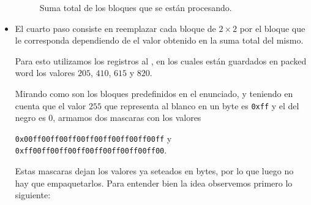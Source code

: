 \begin{itemize}
\begin{figure}[H]

    \caption{Suma total de los bloques que se están procesando.}
    \label{PHADDW}
  \end{figure}

  \item El cuarto paso consiste en reemplazar cada bloque de $2 \times 2$ por el bloque que le corresponda dependiendo de el valor obtenido en la suma total del mismo.

  Para esto utilizamos los registros  al , en los cuales están guardados en packed word los valores $205$, $410$, $615$ y $820$.

  Mirando como son los bloques predefinidos en el enunciado, y teniendo en cuenta que el valor $255$ que representa al blanco en un byte es \texttt{0xff} y el del negro es 0, armamos dos mascaras con los valores

  \texttt{0x00ff00ff00ff00ff00ff00ff00ff00ff} y \texttt{0xff00ff00ff00ff00ff00ff00ff00ff00}.

  Estas mascaras dejan los valores ya seteados en bytes, por lo que luego no hay que empaquetarlos.
  Para entender bien la idea observemos primero lo siguiente:


\end{itemize}
